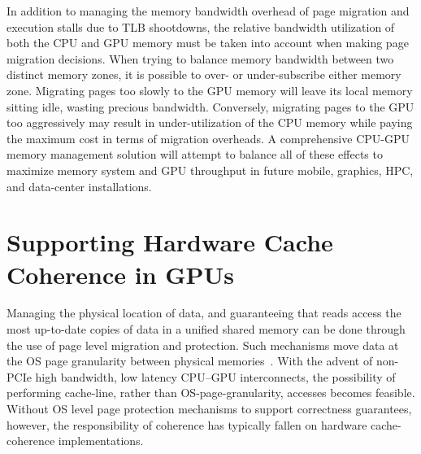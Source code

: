 In addition to managing the memory bandwidth overhead of page migration and
execution stalls due to TLB shootdowns, the relative bandwidth utilization of
both the CPU and GPU memory must be taken into account when making page
migration decisions.  When trying to balance memory bandwidth between two
distinct memory zones, it is possible to over- or under-subscribe either memory
zone. Migrating pages too slowly to the GPU memory will leave its local memory
sitting idle, wasting precious bandwidth.  Conversely, migrating pages to the
GPU too aggressively may result in under-utilization of the CPU memory while
paying the maximum cost in terms of migration overheads. A comprehensive CPU-GPU
memory management solution will attempt to balance all of these effects to
maximize memory system and GPU throughput in future mobile, graphics, HPC, and
data-center installations.

\section{Supporting Hardware Cache Coherence in GPUs}

Managing the physical location of data, and guaranteeing that reads access the
most up-to-date copies of data in a unified shared memory can be done through
the use of page level migration and protection. Such mechanisms move data at the
OS page granularity between physical memories~\cite{UVM}.  With the advent of
non-PCIe high bandwidth, low latency CPU--GPU interconnects, the possibility of
performing cache-line, rather than OS-page-granularity, accesses becomes
feasible.  Without OS level page protection mechanisms to support correctness
guarantees, however,  the responsibility of coherence has typically fallen on
hardware cache-coherence implementations.

